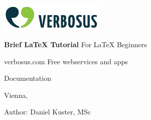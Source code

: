 \begin{titlepage}

\begin{flushright}

\rightskip=-2.5cm

\includegraphics[width=50mm]{logo_dark.png}

\bigskip
\bigskip
\bigskip
\bigskip

\LARGE{\textbf{Brief LaTeX Tutorial}}
\linebreak
\large{For LaTeX Beginners}

\bigskip
\bigskip
\bigskip
\bigskip
\bigskip

\LARGE{verbosus.com}
\linebreak
\large{Free webservices and apps}

\bigskip
\bigskip
\bigskip
\bigskip
\bigskip
\bigskip

\large{Documentation}

\bigskip

\normalsize{Vienna, \the\month}

\bigskip
\bigskip
\bigskip
\bigskip
\bigskip
\bigskip
\bigskip
\bigskip
\bigskip
\bigskip
\bigskip
\bigskip
\bigskip

\normalsize{Author:}
\linebreak
\large{Daniel Kuster, MSc}

\end{flushright}
\end{titlepage}

